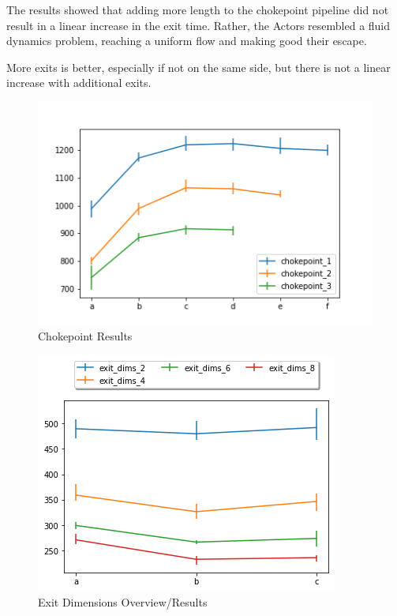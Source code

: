 \documentclass[12pt,letterpaper]{article}
\begin{document}
The results showed that adding more length to the chokepoint pipeline did not
result in a linear increase in the exit time. Rather, the Actors resembled a
fluid dynamics problem, reaching a uniform flow and making good their escape.

More exits is better, especially if not on the same side, but there is not a
linear increase with additional exits.

\begin{figure}
  \centering
  \includegraphics[width=.9\linewidth]{./figures/chokepoint_graph.png}
  \caption{Chokepoint Results}
\end{figure}
\begin{figure}
  \centering
  \includegraphics[width=.75\linewidth]{./figures/exit_dims_graph.png}
  \caption{Exit Dimensions Overview/Results}
\end{figure}
\end{document}
